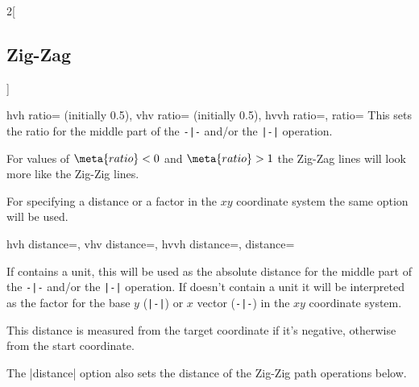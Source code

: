 \begin{multicols*}{2}[\subsection{Zig-Zag}]
\begin{keylist}{%
  hvh ratio= (initially 0.5),
  vhv ratio= (initially 0.5),
  hvvh ratio=,
  ratio=}
  This sets the ratio for the middle part of the \verb!-|-! and/or the \verb!|-|! operation.

  For values of $\meta{ratio} < 0$ and $\meta{ratio} > 1$ the Zig-Zag lines will
  look more like the Zig-Zig lines.

\begin{codeexample}[preamble=\usetikzlibrary{ext.paths.ortho}]
\end{codeexample}
\end{keylist}

For specifying a distance or a factor in the $x\!y$ coordinate system the same option will be used.
\begin{keylist}{%
  hvh distance=,
  vhv distance=,
  hvvh distance=,
  distance=}
  
If  contains a unit, this will be used as the absolute distance
for the middle part of the \verb!-|-! and/or the \verb!|-|! operation.
If  doesn't contain a unit it will be interpreted
as the factor for the base $y$ (\verb!|-|!) or $x$ vector (\verb!-|-!)
in the $x\!y$ coordinate system.

This distance is measured from the target coordinate if it's negative,
otherwise from the start coordinate.

The |distance| option also sets the distance of the Zig-Zig path operations below.

\begin{codeexample}[width=6cm,preamble=\usetikzlibrary{ext.paths.ortho}]
\end{codeexample}
\end{keylist}
\end{multicols*}

